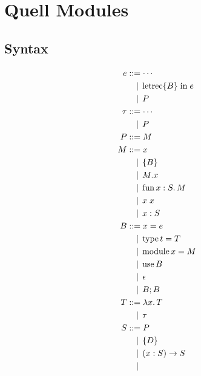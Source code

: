 \section{Quell Modules}

\subsection{Syntax}

\begin{align*}
  e
  &\BNFassign \cdots \\
  &\BNFor \symletrec \{B\} \symin e \\
  &\BNFor P \\
  \tau
  &\BNFassign \cdots \\
  &\BNFor P \\
  P
  &\BNFassign M \\
  M
  &\BNFassign x \\
  &\BNFor \{B\} \\
  &\BNFor M.x \\
  &\BNFor \symfun x: S\ldotp M \\
  &\BNFor x\; x \\
  &\BNFor x: S \\
  B
  &\BNFassign x = e \\
  &\BNFor \symtype t = T \\
  &\BNFor \symmodule x = M \\
  &\BNFor \symuse B \\
  &\BNFor \epsilon \\
  &\BNFor B; B \\
  T
  &\BNFassign \lambda x\ldotp T \\
  &\BNFor \tau \\
  S
  &\BNFassign P \\
  &\BNFor \{D\} \\
  &\BNFor (x: S) \to S \\
  &\BNFor
\end{align*}
